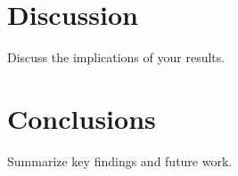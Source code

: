 \documentclass[11pt,a4paper]{article}
\theoremstyle{plain}
\theoremstyle{definition}
\theoremstyle{remark}
\begin{document}
\section{Discussion}
\label{sec:discussion}

Discuss the implications of your results.


\section{Conclusions}
\label{sec:conclusions}

Summarize key findings and future work.



\end{document}
